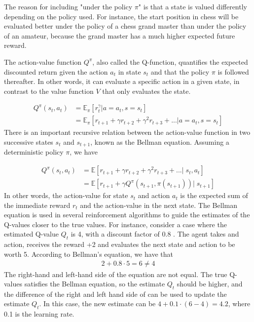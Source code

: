 \documentclass[class=book, crop=false, 11pt]{standalone}
\begin{document}
The reason for including "under the policy $\pi$" is that a state is valued differently depending on the policy used. For instance, the start position in chess will be evaluated better under the policy of a chess grand master than under the policy of an amateur, because the grand master has a much higher expected future reward. 



The action-value function $Q^{\pi}$, also called the Q-function, quantifies the expected discounted return given the action $a_{t}$ in state $s_{t}$ and that the policy $\pi$ is followed thereafter. In other words, it can evaluate a specific action in a given state, in contrast to the value function $V$ that only evaluates the state.

\begin{equation}
   \begin{aligned}\label{eq:theory:action_value_function}
Q^{\pi}(s_{t},a_{t}) 
&= \mathbb{E}_{\pi}[r^{\gamma}_{t}|a=a_{t} ,s=s_{t}]
\\
&= \mathbb{E}_{\pi}[ r_{t+1} + \gamma r_{t+2} + \gamma^{2} r_{t+3} + ...|a=a_{t} ,s=s_{t}]
\end{aligned} 
\end{equation}
There is an important recursive relation between the action-value function in two successive states $s_{t}$ and $s_{t+1}$, known as the Bellman equation. Assuming a deterministic policy $\pi$, we have

\begin{equation}
   \begin{aligned}\label{eq:theory:bellman_equation}
Q^{\pi}(s_{t},a_{t}) 
&= \mathbb{E}[r_{t+1} + \gamma r_{t+2} + \gamma^{2} r_{t+3} + ... |\; s_{t}, a_{t}] \\
& = \mathbb{E}[r_{t+1} +\gamma Q^{\pi}(s_{t+1},\pi(s_{t+1}))|\; s_{t+1}]
\end{aligned} 
\end{equation}
In other words, the action-value for state $s_{t}$ and action $a_{t}$ is the expected sum of the immediate reward $r_{t}$ and the action-value in the next state. The Bellman equation is used in several reinforcement algorithms to guide the estimates of the Q-values closer to the true values. For instance, consider a case where the estimated Q-value $Q_{t}$ is 4, with a discount factor of 0.8 . The agent takes and action, receives the reward +2 and evaluates the next state and action to be worth 5. According to Bellman's equation, we have that 
\begin{equation}
   \begin{aligned}\label{eq:theory:bellman_equation_example}
2 + 0.8\cdot5 = 6 \neq 4
\end{aligned} 
\end{equation}
The right-hand and left-hand side of the equation are not equal. The true Q-values satisfies the Bellman equation, so the estimate $Q_{t}$ should be higher, and the difference of the right and left hand side of can be used to update the estimate $Q_{t}$. In this case, the new estimate can be $4 + 0.1\cdot(6-4) = 4.2$, where 0.1 is the learning rate.
\end{document}
